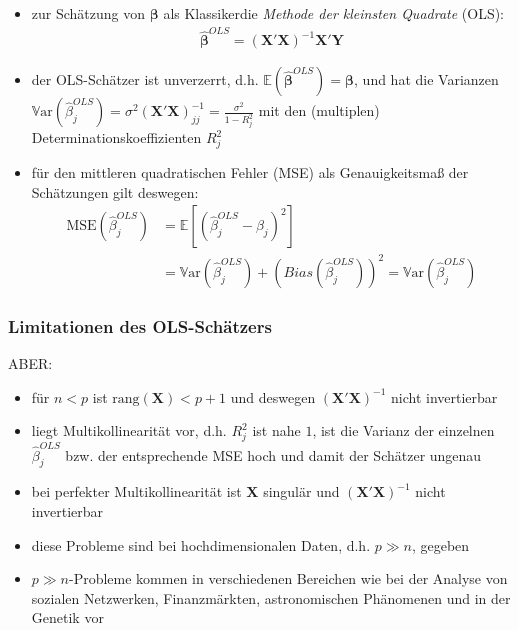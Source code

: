 \documentclass{beamer}
\begin{document}
\begin{frame} %
  \begin{itemize}
  \item zur Schätzung von $\boldsymbol{\beta}$ als \glqq Klassiker\grqq die \textit{Methode der kleinsten Quadrate} (OLS):
  \begin{align*}
  \boldsymbol{\hat{\beta}}^{OLS}=\left(\mathbf{X}'\mathbf{X}\right)^{-1}\mathbf{X}'\mathbf{Y}
  \end{align*}
  \pause \item der OLS-Schätzer ist unverzerrt, d.h. $\mathbb{E}(\boldsymbol{\hat{\beta}}^{OLS})=\boldsymbol{\beta}$, und hat die Varianzen $\mathbb{V}\text{ar}(\hat{\beta}_j^{OLS})=\sigma^2 (\mathbf{X}'\mathbf{X})^{-1}_{jj}=\frac{\sigma^2}{1-R^2_j}$ mit den (multiplen) Determinationskoeffizienten $R^2_j$
  \pause \item für den mittleren quadratischen Fehler (MSE) als Genauigkeitsmaß der Schätzungen gilt deswegen:
  \begin{align*}
  \text{MSE}(\hat{\beta}_j^ {OLS})&=\mathbb{E}[(\hat{\beta}_j^ {OLS} - \beta_j)^2]\\
  &=\mathbb{V}\text{ar}(\hat{\beta}_j^ {OLS})+(Bias(\hat{\beta}_j^ {OLS}))^2=\mathbb{V}\text{ar}(\hat{\beta}_j^ {OLS})
  \end{align*}
  \end{itemize}
\end{frame}




\begin{frame} %
  \frametitle{Limitationen des OLS-Schätzers} 
  ABER: 
    \begin{itemize}
    \pause \item für $n < p$ ist $\text{rang}(\mathbf{X}
    )<p+1$ und deswegen $\left(\mathbf{X}'\mathbf{X}\right)^{-1}$ nicht invertierbar
    \pause \item liegt Multikollinearität vor, d.h. $R^2_j$ ist nahe $1$, ist die Varianz der einzelnen $\hat{\beta}_j^{OLS}$ bzw. der entsprechende MSE hoch und damit der Schätzer ungenau
    \pause \item bei perfekter Multikollinearität ist $\mathbf{X}$ singulär und $\left(\mathbf{X}'\mathbf{X}\right)^{-1}$ nicht invertierbar
    \end{itemize}
    \begin{itemize}
    \pause \item diese Probleme sind bei hochdimensionalen Daten, d.h. $p \gg n$, gegeben
    \item $p \gg n$-Probleme kommen in verschiedenen Bereichen wie bei der Analyse von sozialen Netzwerken, Finanzmärkten, astronomischen Phänomenen und in der Genetik vor
    \end{itemize}
    
\end{frame}
\end{document}
